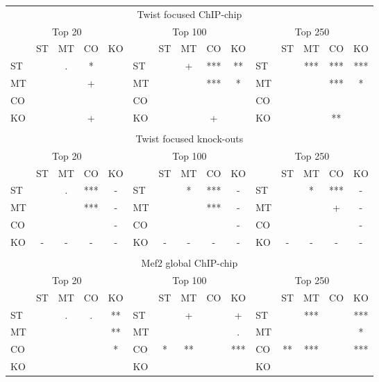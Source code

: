 \documentclass{article}
\begin{document}
\begin{longtable}[c]{lcccc|lcccc|lcccc}
\multicolumn{15}{c}{Twist focused ChIP-chip} \\
\multicolumn{5}{c|}{Top 20} &\multicolumn{5}{c|}{Top 100}  & \multicolumn{5}{c}{Top 250}\\
    & ST  & MT  & CO  & KO &     & ST  & MT  & CO  & KO  &     & ST  & MT  & CO  & KO \\
ST &     & .   & *   &     & ST &     & +   & *** & **  & ST &     & *** & *** & ***\\
MT &     &     & +   &     & MT &     &     & *** & *   & MT &     &     & *** & *  \\
CO &     &     &     &     & CO &     &     &     &     & CO &     &     &     &    \\
KO &     &     & +   &     & KO &     &     & +   &     & KO &     &     & **  &    \\
\hline
\\[0mm]
\multicolumn{15}{c}{Twist focused knock-outs} \\
\multicolumn{5}{c|}{Top 20} &\multicolumn{5}{c|}{Top 100}  & \multicolumn{5}{c}{Top 250}\\
    & ST  & MT  & CO  & KO &     & ST  & MT  & CO  & KO  &     & ST  & MT  & CO  & KO \\
ST &     & .   & *** & -   & ST &     & *   & *** & -   & ST &     & *   & *** & -  \\
MT &     &     & *** & -   & MT &     &     & *** & -   & MT &     &     & +   & -  \\
CO &     &     &     & -   & CO &     &     &     & -   & CO &     &     &     & -  \\
KO & -   & -   & -   & -   & KO & -   & -   & -   & -   & KO & -   & -   & -   & -  \\
\hline
\\[0mm]
\multicolumn{15}{c}{Mef2 global ChIP-chip} \\
\multicolumn{5}{c|}{Top 20} &\multicolumn{5}{c|}{Top 100}  & \multicolumn{5}{c}{Top 250}\\
    & ST  & MT  & CO  & KO &     & ST  & MT  & CO  & KO  &     & ST  & MT  & CO  & KO \\
ST &     & .   & .   & **  & ST &     & +   &     & +   & ST &     & *** &     & ***\\
MT &     &     &     & **  & MT &     &     &     & .   & MT &     &     &     & *  \\
CO &     &     &     & *   & CO & *   & **  &     & *** & CO & **  & *** &     & ***\\
KO &     &     &     &     & KO &     &     &     &     & KO &     &     &     &    \\

\end{longtable}
\end{document}

